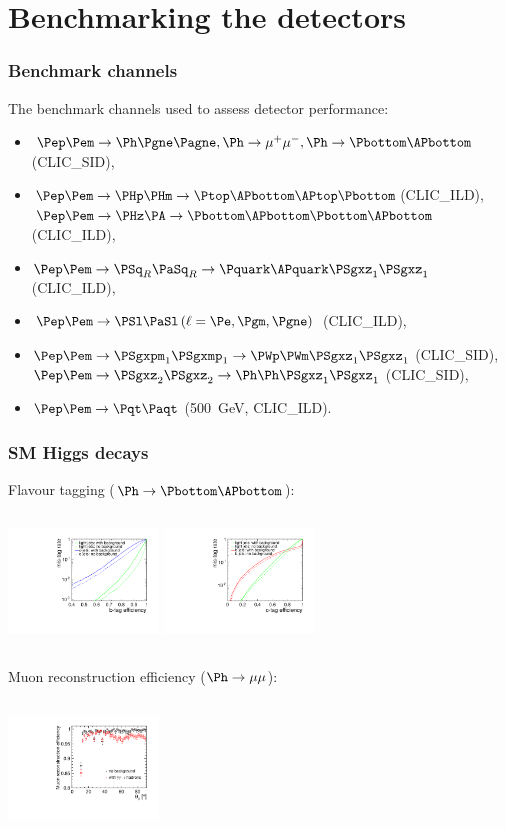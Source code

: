 \documentclass{beamer}
\begin{document}
\section{Benchmarking the detectors}
\begin{frame}
 \frametitle{Benchmark channels}
The benchmark channels used to assess detector performance:
\begin{itemize}
\item $\Pep\Pem \to \Ph \Pgne \Pagne, \Ph \to \mu^+\mu^-, \Ph \to
\Pbottom\APbottom$ (CLIC\_SID),
\item  $\Pep\Pem \to \PHp \PHm\to \Ptop\APbottom\APtop\Pbottom$(CLIC\_ILD),\\
$\Pep\Pem \to \PHz \PA\to\Pbottom\APbottom\Pbottom\APbottom$ (CLIC\_ILD),
\item $\Pep\Pem \to \PSq_R \PaSq_R\to\Pquark\APquark\PSgxz_1\PSgxz_1$
(CLIC\_ILD),
\item $\Pep\Pem \to \PSl \PaSl \,(\ell = \Pe,\Pgm,\Pgne)$ (CLIC\_ILD), 
\item $\Pep\Pem \to \PSgxpm_1 \PSgxmp_1\to\PWp\PWm\PSgxz_1\PSgxz_1$
(CLIC\_SID),\\ $\Pep\Pem \to \PSgxz_2 \PSgxz_2\to \Ph\Ph\PSgxz_1\PSgxz_1$
(CLIC\_SID),
\item  $\Pep\Pem \to \Pqt \Paqt$ (500~GeV, CLIC\_ILD).
\end{itemize} 
\end{frame}
\begin{frame}
\frametitle{SM Higgs decays}
Flavour tagging ($\Ph\to\Pbottom\APbottom$):
\begin{columns}[c]
\column{4cm}
\centering
\includegraphics[width=4cm]{../SIDWorkshop/Light_Higgs_Flavour_Tag.pdf}
\column{4cm}
\centering
\includegraphics[width=4cm]{../SIDWorkshop/Light_Higgs_Flavour_Tag_C.pdf}
\end{columns}
Muon reconstruction efficiency ($\Ph\to\mu\mu$):
\begin{columns}[c]
\column{4cm}
\centering
\includegraphics[width=4cm]{../SIDWorkshop/MuonEfficiency2.pdf}
\column{4cm}
\centering
\end{columns}
\end{frame}
\end{document}

